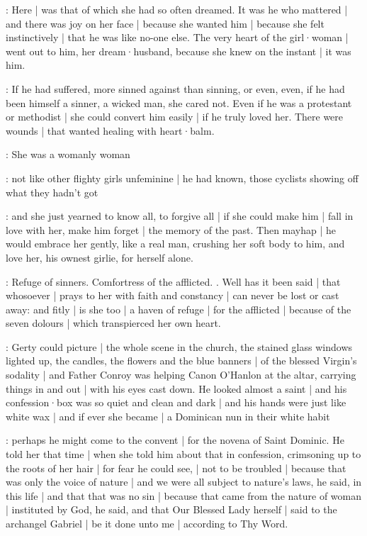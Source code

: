 \gertyRomantic:
Here |
was that of which she had so often dreamed.
It was he who mattered |
and there was joy on her face |
because she wanted him |
because she felt instinctively |
that he was like no-one else.%
The very heart of the girl·woman |
went out to him,
her dream·husband,
because she knew on the instant |
it was him.

\gertyNovel:
If he had suffered,
more sinned against than sinning,
or even,
even,
if he had been himself a sinner,
a wicked man,
she cared not.
Even if he was a protestant or methodist |
she could convert him easily |
if he truly loved her.
There were wounds |
that wanted healing with heart·balm.

\gertySex:
She was a womanly woman

\gertyJudgy:
not like other flighty girls unfeminine |
he had known,
those cyclists showing off what they hadn't got

\gertySex:
and she just yearned to know all,
to forgive all |
if she could make him |
fall in love with her,
make him forget |
the memory of the past.
Then mayhap |
he would embrace her gently,
like a real man,
crushing her soft body to him,%
and love her,
his ownest girlie,
for herself alone.

\Nrelig:
Refuge of sinners.
Comfortress of the afflicted.
.
Well has it been said |
that whosoever |
prays to her with faith and constancy |
can never be lost or cast away:
and fitly |
is she too |
a haven of refuge |
for the afflicted |
because of the seven dolours |
which transpierced her own heart.

\gertyReal:
Gerty could picture |
the whole scene in the church,
the stained glass windows lighted up,
the candles,
the flowers
and the blue banners |
of the blessed Virgin's sodality |
and Father Conroy
was helping Canon O'Hanlon at the altar,
carrying things in and out |
with his eyes cast down.
He looked almost a saint |%
and his confession·box
was so quiet and clean and dark |
and his hands were just like white wax |
and if ever she became |
a Dominican nun in their white habit

\gertySex:
perhaps he might come to the convent |
for the novena of Saint Dominic.
He told her that time |
when she told him about that in confession,
crimsoning up to the roots of her hair |
for fear he could see, |
not to be troubled |
because that was only the voice of nature |
and we were all subject to nature's laws,
he said,
in this life |
and that that was no sin |
because that came from the nature of woman |
instituted by God,
he said,
and that Our Blessed Lady herself |
said to the archangel Gabriel |
be it done unto me |
according to Thy Word.

